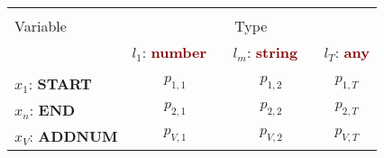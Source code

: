 \renewcommand{\arraystretch}{0.5}
\scriptsize
\begin{tabular}{@{}l@{\hskip 1mm} c@{\hskip 1mm} c@{\hskip 1mm} c@{}}
\toprule\\
Variable & \multicolumn{3}{c}{Type}\\ 
\cmidrule(l){2-4}
& $l_1$: \textbf{\textcolor{Maroon}{number}} \ & $l_m$: \textbf{\textcolor{Maroon}{string}} \ & $l_T$: \textbf{\textcolor{Maroon}{any}}\\ 
\midrule\\
$x_1$: \textbf{\textcolor{mygreen}{START}} & $p_{1,1}$ & $p_{1,2}$ & $p_{1,T}$\\
$x_n$: \textbf{\textcolor{mygreen}{END}} & $p_{2,1}$ & $p_{2,2}$ & $p_{2,T}$\\
$x_V$: \textbf{\textcolor{mygreen}{ADDNUM}} & $p_{V,1}$ & $p_{V,2}$ & $p_{V,T}$\\
\bottomrule
\end{tabular}
